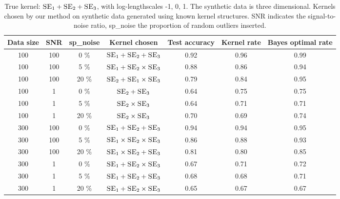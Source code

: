\documentclass[twoside]{article}
\begin{document}
\begin{table*}[ht!]
\caption{{\small
True kernel: $ \textsc{SE}_1 + \textsc{SE}_2 + \textsc{SE}_3$, with log-lengthscales -1, 0, 1. The synthetic data is three dimensional. 
Kernels chosen by our method on synthetic data generated using known kernel structures. SNR indicates the signal-to-noise ratio, sp\_noise the proportion of random outliers inserted.  
}} 

\label{tbl:synthetic1}
\begin{center}
{\small
\begin{tabular}{|c c  c | c |  c | c c| }
\hline Data size & SNR & sp\_noise &  Kernel chosen & Test accuracy & Kernel rate & Bayes optimal rate \\
\hline 
100    &   100  &  0 \%   &    $\textsc{SE}_1 + \textsc{SE}_2 + \textsc{SE}_3$   &    0.92  &  0.96 & 0.99 \\
100    &   100  &  5 \%   &    $\textsc{SE}_1 + \textsc{SE}_2 \times \textsc{SE}_3$   &    0.88  &  0.86 & 0.94 \\
100    &   100  &  20 \%   &    $\textsc{SE}_2 + \textsc{SE}_1 \times \textsc{SE}_3$   &    0.79  &  0.84 & 0.95 \\ 
100    &   1  &  0 \%    &    $\textsc{SE}_2 + \textsc{SE}_3 $   &    0.64  &  0.75 & 0.75    \\
100    &   1  &  5 \%    &    $\textsc{SE}_2 \times \textsc{SE}_3 $   &    0.64  &  0.71 & 0.71    \\
100    &   1  &  20 \%   &    $\textsc{SE}_2 \times \textsc{SE}_3 $ &    0.70  &  0.69 & 0.74 \\

\hline  300    &   100  &  0 \%   &    $\textsc{SE}_1 + \textsc{SE}_2 + \textsc{SE}_3$   &    0.94  &  0.94 & 0.95 \\
300    &   100  &  5 \%   &    $\textsc{SE}_1 \times \textsc{SE}_2 \times \textsc{SE}_3$   &    0.86  &  0.88 & 0.93 \\
300    &   100  &  20 \%   &    $\textsc{SE}_1 \times \textsc{SE}_2 + \textsc{SE}_3 $   &    0.81  &  0.80 & 0.85 \\ 
300    &   1  &  0 \%   &    $\textsc{SE}_1 + \textsc{SE}_2 \times \textsc{SE}_3 $   &    0.67  &  0.71 & 0.72    \\
300    &   1  &  5 \%   &   $\textsc{SE}_1 + \textsc{SE}_2 + \textsc{SE}_3$   &    0.68  &  0.68 & 0.71    \\
300    &   1  &  20 \%   &    $\textsc{SE}_1 + \textsc{SE}_2 \times \textsc{SE}_3 $ &    0.65  &  0.67 & 0.67 \\


\end{tabular}}
\end{center}
\end{table*}
\end{document}
